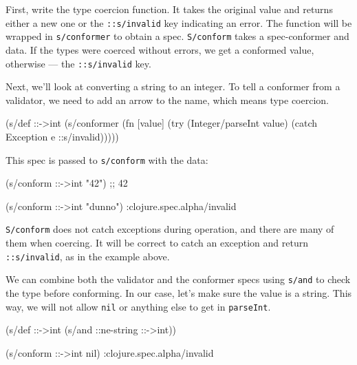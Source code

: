 \label{spec-invalid}



First, write the type coercion function. It takes the original value and returns either a new one or the \verb|::s/invalid| key indicating an error. The function will be wrapped in \verb|s/conformer| to obtain a spec.  \verb|S/conform| takes a spec-conformer and data. If the types were coerced without errors, we get a conformed value, otherwise — the \verb|::s/invalid| key.

Next, we'll look at converting a string to an integer. To tell a conformer from a validator, we need to add an arrow to the name, which means type coercion.

\begin{english}
  \begin{clojure}
(s/def ::->int
  (s/conformer
   (fn [value]
     (try
       (Integer/parseInt value)
       (catch Exception e
         ::s/invalid)))))
  \end{clojure}
\end{english}

\noindent
This spec is passed to \verb|s/conform| with the data:

\begin{english}
  \begin{clojure}
(s/conform ::->int "42") ;; 42

(s/conform ::->int "dunno")
:clojure.spec.alpha/invalid
  \end{clojure}
\end{english}


\verb|S/conform| does not catch exceptions during operation, and there are many of them when coercing. It will be correct to catch an exception and return \verb|::s/invalid|, as in the example above.

We can combine both the validator and the conformer specs using \verb|s/and| to check the type before conforming. In our case, let's make sure the value is a string. This way, we will not allow \verb|nil| or anything else to get in \verb|parseInt|.

\begin{english}
  \begin{clojure}
(s/def ::->int
  (s/and ::ne-string ::->int))

(s/conform ::->int nil)
:clojure.spec.alpha/invalid
  \end{clojure}
\end{english}

